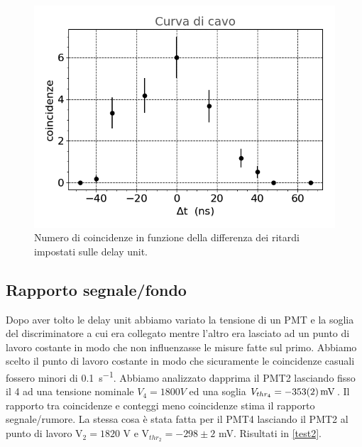\documentclass[a4paper]{article}
\begin{document}
\begin{figure}[h]
\centering
\includegraphics[width=8 cm]{curva_cavo}
\caption{Numero di coincidenze in funzione della differenza dei ritardi impostati sulle delay unit.}
\label{curv}
\end{figure}



\subsection*{Rapporto segnale/fondo}

Dopo aver tolto le delay unit abbiamo variato la tensione di un PMT  e la soglia del discriminatore a cui era collegato mentre l'altro era lasciato ad un punto di lavoro costante in modo che non influenzasse le misure fatte sul primo.
Abbiamo scelto il punto di lavoro costante in modo che sicuramente le coincidenze casuali fossero minori di \SI{0.1}{s^{-1}}.
Abbiamo analizzato dapprima il PMT2 lasciando fisso il 4 ad una tensione nominale $V_4=\SI{1800} V$ ed una soglia $V_{thr_4}=\SI{-353\pm2}{mV}$. 
Il rapporto tra coincidenze e conteggi meno coincidenze stima il rapporto segnale/rumore.
La stessa cosa è stata fatta per il PMT4 lasciando il PMT2 al punto di lavoro V$_2=1820$\! V e V$_{thr_2}=-298\pm2$\! mV.
Risultati in \autoref{test2}.
\end{document}
